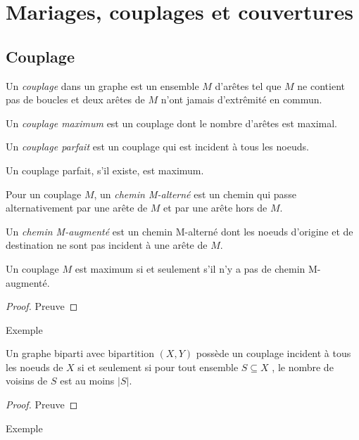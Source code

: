\section{Mariages, couplages et couvertures}
\subsection{Couplage}
\begin{mydef}
  Un \emph{couplage} dans un graphe est un ensemble $M$ d’arêtes tel que $M$ ne contient pas de boucles et deux arêtes de $M$ n’ont jamais d’extrêmité en commun.
\end{mydef}

\begin{mydef}
  Un \emph{couplage maximum} est un couplage dont le nombre d’arêtes est maximal.
\end{mydef}

\begin{mydef}
  Un \emph{couplage parfait} est un couplage qui est incident à tous les noeuds.
\end{mydef}

\begin{myrem}
  Un couplage parfait, s’il existe, est maximum.
\end{myrem}

\begin{mydef}
  Pour un couplage $M$, un \emph{chemin M-alterné} est un chemin qui passe alternativement par une arête de $M$ et par une arête hors de $M$.
\end{mydef}

\begin{mydef}
  Un \emph{chemin M-augmenté} est un chemin M-alterné dont les noeuds d’origine et de destination ne sont pas incident à une arête de $M$.
\end{mydef}

\begin{mytheo} [Berge]
  Un couplage $M$ est maximum si et seulement s’il n’y a pas de chemin M-augmenté.
  \begin{proof}
     Preuve \addTODO
  \end{proof}
\end{mytheo}
\begin{myexem}
  Exemple \addTODO
\end{myexem}

\begin{mytheo} 
  Un graphe biparti avec bipartition $(X , Y)$ possède un couplage incident à tous les noeuds de $X$ si et seulement si pour tout ensemble $S \subseteq X$ , le nombre de voisins de $S$ est au moins $|S|$.
  \begin{proof}
     Preuve \addTODO
  \end{proof}
\end{mytheo}
\begin{myexem}
  Exemple \addTODO
\end{myexem}

